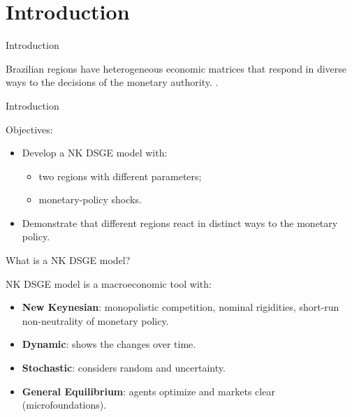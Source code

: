\documentclass[../quali_slides.tex]{subfiles}
\begin{document}
	
\section{Introduction}


\begin{frame}{Introduction}
	
	Brazilian regions have heterogeneous economic matrices that respond in diverse ways to the decisions of the monetary authority. \cite{bertanha_efeitos_2008}.		
	
\end{frame}


\begin{frame}{Introduction}

	Objectives:
	
	\begin{itemize}
		
		\item Develop a NK DSGE model with:
			
			\begin{itemize}
				\item two regions with different parameters;
				\item monetary-policy shocks.
			\end{itemize}
		
		\item Demonstrate that different regions react in distinct ways to the monetary policy.
		
	\end{itemize}

\end{frame}


\begin{frame}{What is a NK DSGE model?}
	
	NK DSGE model is a macroeconomic tool with:
	
	\begin{itemize}
		
		\item \textbf{New Keynesian}: monopolistic competition, nominal rigidities, short-run non-neutrality of monetary policy.
		
		\item \textbf{Dynamic}: shows the changes over time.
		
		\item \textbf{Stochastic}: considers random and uncertainty.
		
		\item \textbf{General Equilibrium}: agents optimize and markets clear (microfoundations).
		
	\end{itemize}
	
\end{frame}
\end{document}
